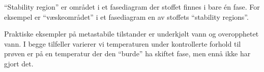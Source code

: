 ``Stability region'' er området i et fasediagram der stoffet finnes i bare én fase. For eksempel er ``væskeområdet'' i et fasediagram en av stoffets ``stability regions''.

\vskip 10pt

Praktiske eksempler på metastabile tilstander er underkjølt vann og overopphetet vann. I begge tilfeller varierer vi temperaturen under kontrollerte forhold til prøven er på en temperatur der den ``burde'' ha skiftet fase, men ennå ikke har gjort det.









